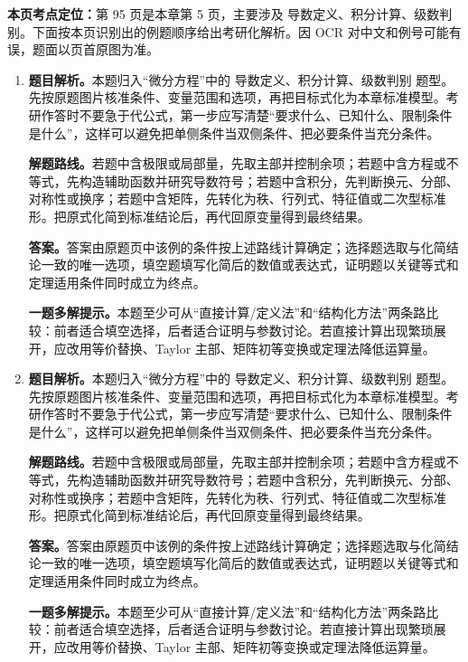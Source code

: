 \begin{solutionblock}
\textbf{本页考点定位：}第 95 页是本章第 5 页，主要涉及 导数定义、积分计算、级数判别。下面按本页识别出的例题顺序给出考研化解析。因 OCR 对中文和例号可能有误，题面以页首原图为准。

\begin{enumerate}[label=\textbf{例\arabic*.}, leftmargin=2.4em]

\item \textbf{题目解析。}本题归入“微分方程”中的 导数定义、积分计算、级数判别 题型。先按原题图片核准条件、变量范围和选项，再把目标式化为本章标准模型。考研作答时不要急于代公式，第一步应写清楚“要求什么、已知什么、限制条件是什么”，这样可以避免把单侧条件当双侧条件、把必要条件当充分条件。

\textbf{解题路线。}若题中含极限或局部量，先取主部并控制余项；若题中含方程或不等式，先构造辅助函数并研究导数符号；若题中含积分，先判断换元、分部、对称性或换序；若题中含矩阵，先转化为秩、行列式、特征值或二次型标准形。把原式化简到标准结论后，再代回原变量得到最终结果。

\textbf{答案。}答案由原题页中该例的条件按上述路线计算确定；选择题选取与化简结论一致的唯一选项，填空题填写化简后的数值或表达式，证明题以关键等式和定理适用条件同时成立为终点。

\textbf{一题多解提示。}本题至少可从“直接计算/定义法”和“结构化方法”两条路比较：前者适合填空选择，后者适合证明与参数讨论。若直接计算出现繁琐展开，应改用等价替换、Taylor 主部、矩阵初等变换或定理法降低运算量。

\item \textbf{题目解析。}本题归入“微分方程”中的 导数定义、积分计算、级数判别 题型。先按原题图片核准条件、变量范围和选项，再把目标式化为本章标准模型。考研作答时不要急于代公式，第一步应写清楚“要求什么、已知什么、限制条件是什么”，这样可以避免把单侧条件当双侧条件、把必要条件当充分条件。

\textbf{解题路线。}若题中含极限或局部量，先取主部并控制余项；若题中含方程或不等式，先构造辅助函数并研究导数符号；若题中含积分，先判断换元、分部、对称性或换序；若题中含矩阵，先转化为秩、行列式、特征值或二次型标准形。把原式化简到标准结论后，再代回原变量得到最终结果。

\textbf{答案。}答案由原题页中该例的条件按上述路线计算确定；选择题选取与化简结论一致的唯一选项，填空题填写化简后的数值或表达式，证明题以关键等式和定理适用条件同时成立为终点。

\textbf{一题多解提示。}本题至少可从“直接计算/定义法”和“结构化方法”两条路比较：前者适合填空选择，后者适合证明与参数讨论。若直接计算出现繁琐展开，应改用等价替换、Taylor 主部、矩阵初等变换或定理法降低运算量。


\end{enumerate}
\end{solutionblock}
